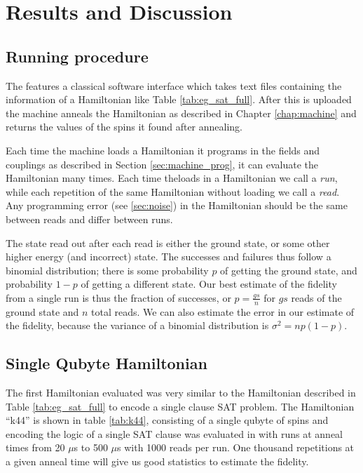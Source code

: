 \chapter{Results and Discussion}

\section{Running procedure}
\label{sec:prog}
The \machine features a classical software interface which takes text files containing the information of a Hamiltonian like Table \ref{tab:eg_sat_full}.  After this is uploaded the machine anneals the Hamiltonian as described in Chapter \ref{chap:machine} and returns the values of the spins it found after annealing.

Each time the machine loads a Hamiltonian it programs in the fields and couplings as described in Section \ref{sec:machine_prog}, it can evaluate the Hamiltonian many times.  Each time the\machine loads in a Hamiltonian we call a \emph{run}, while each repetition of the same Hamiltonian without loading we call a \emph{read}.  Any programming error (see \ref{sec:noise}) in the Hamiltonian should be the same between reads and differ between runs.

The state read out after each read is either the ground state, or some other higher energy (and incorrect) state.  The successes and failures thus follow a binomial distribution; there is some probability $p$ of getting the ground state, and probability $1-p$ of getting a different state.
Our best estimate of the fidelity from a single run is thus the fraction of successes, or $p = \frac{gs}{n}$ for $gs$ reads of the ground state and $n$ total reads.  We can also estimate the error in our estimate of the fidelity, because the variance of a binomial distribution is $\sigma^2 = np(1-p)$.

\section{Single Qubyte Hamiltonian}
The first Hamiltonian evaluated was very similar to the Hamiltonian described in Table \ref{tab:eg_sat_full} to encode a single clause SAT problem.  The Hamiltonian ``k44'' is shown in table \ref{tab:k44}, consisting of a single qubyte of spins and encoding the logic of a single SAT clause was evaluated in with runs at anneal times from 20 $\mu$s to 500 $\mu$s with 1000 reads per run.  One thousand repetitions at a given anneal time will give us good statistics to estimate the fidelity.

